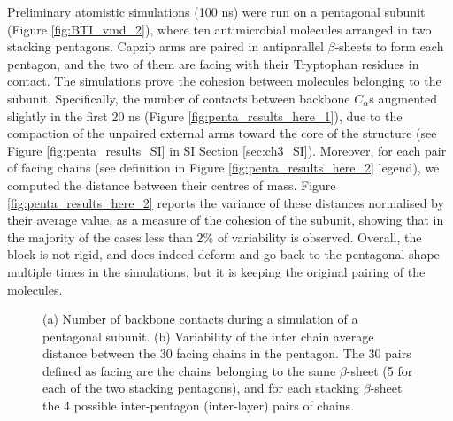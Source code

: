Preliminary atomistic simulations (100 ns) were run on a pentagonal subunit (Figure \ref{fig:BTI_vmd_2}), where ten antimicrobial molecules arranged in two stacking pentagons. Capzip arms are paired in antiparallel $\beta$-sheets to form each pentagon, and the two of them are facing with their Tryptophan residues in contact.
%
The simulations prove the cohesion between molecules belonging to the subunit. Specifically, the number of contacts between backbone $C_\alpha$s augmented slightly in the first 20 ns (Figure \ref{fig:penta_results_here_1}), due to the compaction of the unpaired external arms toward the core of the structure (see Figure \ref{fig:penta_results_SI} in SI Section \ref{sec:ch3_SI}).
%
Moreover, for each pair of facing chains (see definition in Figure \ref{fig:penta_results_here_2} legend), we computed the distance between their centres of mass. Figure \ref{fig:penta_results_here_2} reports the variance of these distances normalised by their average value, as a measure of the cohesion of the subunit, showing that in the majority of the cases less than 2\% of variability is observed. Overall, the block is not rigid, and does indeed deform and go back to the pentagonal shape multiple times in the simulations, but it is keeping the original pairing of the molecules.
\begin{figure}[t]
\centering
{}
\caption[Cohesion measures on the pentagonal subunit]{(a) Number of backbone contacts during a simulation of a pentagonal subunit. (b) Variability of the inter chain average distance between the 30 facing chains in the pentagon. The 30 pairs defined as facing are the chains belonging to the same $\beta$-sheet (5 for each of the two stacking pentagons), and for each stacking $\beta$-sheet the 4 possible inter-pentagon (inter-layer) pairs of chains.}
\label{fig:penta_results_here}
\end{figure}

